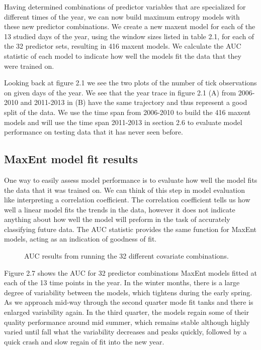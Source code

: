 Having determined combinations of predictor variables that are specialized for different times of the year, we can now build maximum entropy models with these new predictor combinations. We create a new maxent model for each of the 13 studied days of the year, using the window sizes listed in table 2.1, for each of the 32 predictor sets, resulting in 416 maxent models. We calculate the AUC statistic of each model to indicate how well the models fit the data that they were trained on. \newline

\noindent Looking back at figure 2.1 we see the two plots of the number of tick observations on given days of the year. We see that the year trace in figure 2.1 (A)  from 2006-2010 and 2011-2013 in (B) have the same trajectory and thus represent a good split of the data. We use the time span from 2006-2010 to build the 416 maxent models and will use the time span 2011-2013 in section 2.6 to evaluate model performance on testing data that it has never seen before. \newline

\subsection{ MaxEnt model fit results}

One way to easily assess model performance is to evaluate how well the model fits the data that it was trained on. We can think of this step in model evaluation like interpreting a correlation coefficient. The correlation coefficient tells us how well a linear model fits the trends in the data, however it does not indicate anything about how well the model will preform in the task of accurately classifying future data. The AUC statistic provides the same function for MaxEnt models, acting as an indication of goodness of fit. \newline

\begin{figure} [!ht]
\centerline{}
\caption{AUC results from running the 32 different covariate combinations. }
\label{fig6}
\end{figure}


\noindent Figure 2.7 shows the AUC for 32 predictor combinations MaxEnt models fitted at each of the 13 time points in the year. In the winter months, there is a large degree of variability between the models, which tightens during the early spring. As we approach mid-way through the second quarter mode fit tanks and there is enlarged variability again. In the third quarter, the models regain some of their quality performance around mid summer, which remains stable although highly varied until fall what the variability decreases and peaks quickly, followed by a quick crash and slow regain of fit into the new year. 


